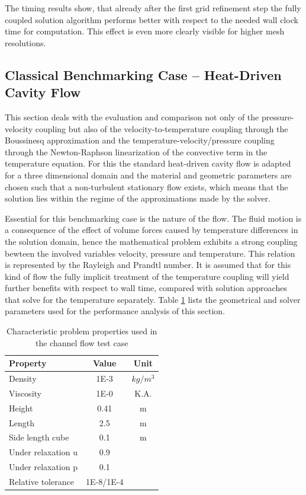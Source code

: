 The timing results show, that already after the first grid refinement step the fully coupled solution algorithm performs better with respect to the needed wall clock time for computation. This effect is even more clearly visible for higher mesh resolutions.

\subsection{Classical Benchmarking Case -- Heat-Driven Cavity Flow}

This section deals with the evaluation and comparison not only of the pressure-velocity coupling but also of the velocity-to-temperature coupling through the Boussinesq approximation and the temperature-velocity/pressure coupling through the Newton-Raphson linearization of the convective term in the temperature equation. For this the standard heat-driven cavity flow \cite{christon02,vahl83} is adapted for a three dimensional domain and the material and geometric parameters are chosen such that a non-turbulent stationary flow exists, which means that the solution lies within the regime of the approximations made by the solver.

Essential for this benchmarking case is the nature of the flow. The fluid motion is a consequence of the effect of volume forces caused by temperature differences in the solution domain, hence the mathematical problem exhibits a strong coupling bewteen the involved variables velocity, pressure and temperature. This relation is represented by the Rayleigh and Prandtl number. It is assumed that for this kind of flow the fully implicit treatment of the temperature coupling will yield further benefits with respect to wall time, compared with solution approaches that solve for the temperature separately. Table \ref{tab:cavity} lists the geometrical and solver parameters used for the performance analysis of this section.

\begin{table}[h!]\centering
{}
  \begin{tabular}{lcc}\toprule
    Property & Value & Unit \\
    \midrule
    \rowcolor{black!20} Density    & 1E-3 & $kg/m^3$      \\
    \rowcolor{black!00} Viscosity  & 1E-0 & K.A.  \\
    \rowcolor{black!20} Height     & 0.41 & m   \\
    \rowcolor{black!00} Length     & 2.5  & m  \\
    \rowcolor{black!20} Side length cube & 0.1  & m  \\
    \rowcolor{black!00} Under relaxation u & 0.9 &  \\
    \rowcolor{black!20} Under relaxation p & 0.1 &  \\
    \rowcolor{black!00} Relative tolerance & 1E-8/1E-4 &
  \end{tabular}
  \caption{Characteristic problem properties used in the channel flow test case}
  \label{tab:cavity}
\end{table}

